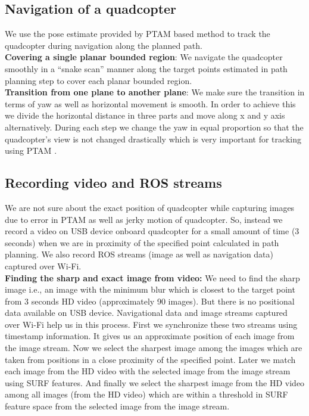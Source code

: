 \subsection{Navigation of a quadcopter}
 We use the pose estimate provided by PTAM  based method \cite{engel}to track
 the quadcopter during navigation along the planned path.\\
\textbf{Covering a single planar bounded region}:
We navigate the quadcopter smoothly in a ``snake scan'' manner along the target points estimated in path
planning step to cover each planar bounded region.\\
\textbf{Transition from one plane to another plane}: We make sure the
transition in terms of yaw as well as horizontal movement is smooth. In order to achieve this
we divide the horizontal distance in three parts and  move along x and y axis
alternatively. During each step we change the yaw in equal proportion so that
the quadcopter’s view is not changed drastically which is very important for
tracking using PTAM \cite{engel}.

\subsection{Recording video and ROS streams}
 We are not sure about the exact position of quadcopter while capturing
 images due to error in PTAM as well as jerky motion of quadcopter.  So,
 instead we record a video on USB device onboard quadcopter for a small amount
 of time (3 seconds) when we are in proximity of the specified point calculated in path planning. We
also record ROS streams (image as well as navigation data) captured over Wi-Fi.\\
\textbf{Finding the sharp and exact image from video:} We need to find the sharp
image i.e., an image with the minimum blur which is closest to the target point
from 3 seconds HD video (approximately 90 images). But there is no positional data
available on USB device. Navigational data and image streams captured over Wi-Fi help us
in this process. First we synchronize these two streams using timestamp
information. It gives us an approximate position of each image from the image
stream. Now we select the sharpest image among the images which are taken from
positions in a close proximity of the specified point. Later we match each
image from the HD video with the selected image from the image stream using SURF
features. And finally we select the sharpest image from the HD video among
all images (from the HD video) which are within a threshold in SURF\cite{Bay}
feature space from the selected image from the image stream.

